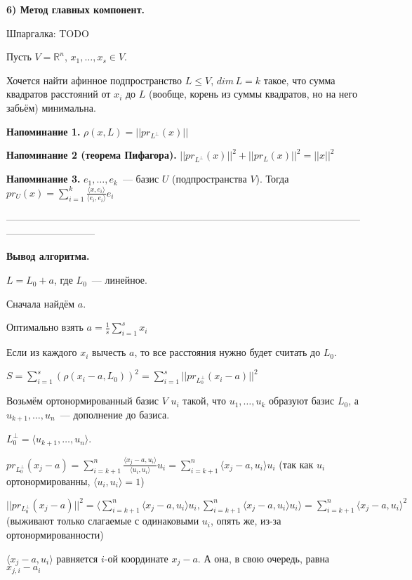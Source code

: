 {\bf 6) Метод главных компонент.}

Шпаргалка: TODO

Пусть $V = \mathbb{R}^n$, $x_1,\ldots, x_s \in V$.

Хочется найти афинное подпространство $L\le V$, $dim\,L = k$ такое, что сумма квадратов расстояний от $x_i$ до $L$ (вообще, корень из суммы квадратов, но на него забьём) минимальна.

{\bf Напоминание 1.} $\rho(x, L) = ||pr_{L^{\perp}}(x)||$

{\bf Напоминание 2 (теорема Пифагора).} $||pr_{L^{\perp}}(x)||^2 + ||pr_L(x)||^2 = ||x||^2$

{\bf Напоминание 3.} $e_1,\ldots,e_k$~--- базис $U$ (подпространства $V$). Тогда $pr_U(x)=\sum\limits_{i=1}^k\frac{\langle x, e_i\rangle}{\langle e_i, e_i\rangle}e_i$

---------------------------------------------------------------------------------------------------------------------------------------

{\bf Вывод алгоритма.}

$L = L_0 + a$, где $L_0$~--- линейное. 

Сначала найдём $a$.

\thrm Оптимально взять $a=\frac{1}{s}\sum\limits_{i=1}^s x_i$

\proof

Если из каждого $x_i$ вычесть $a$, то все расстояния нужно будет считать до $L_0$.

$S = \sum\limits_{i = 1}^s (\rho(x_i-a, L_0))^2 = \sum\limits_{i = 1}^s ||pr_{L_0^{\perp}}(x_i-a)||^2$

Возьмём ортонормированный базис $V$ $u_i$ такой, что $u_1,\ldots, u_k$ образуют базис $L_0$, а $u_{k+1},\ldots,u_n$~--- дополнение до базиса.

$L_0^\perp = \langle u_{k+1},\ldots,u_n\rangle$. 

$pr_{L_0^{\perp}}(x_j-a) = \sum\limits_{i = k + 1}^n \frac{\langle x_j - a, u_i\rangle}{\langle u_i, u_i\rangle}u_i = \sum\limits_{i = k + 1}^n \langle x_j - a, u_i\rangle u_i$ (так как $u_i$ ортонормированны, $\langle u_i, u_i\rangle = 1$)

$||pr_{L_0^{\perp}}(x_j-a)||^2 = \langle\sum\limits_{i = k + 1}^n \langle x_j - a, u_i\rangle u_i, \sum\limits_{i = k + 1}^n \langle x_j - a, u_i\rangle u_i\rangle = \sum\limits_{i = k + 1}^n \langle x_j - a, u_i\rangle^2$ (выживают только слагаемые с одинаковыми $u_i$, опять же, из-за ортонормированности)

$\langle x_j - a, u_i\rangle$ равняется $i$-ой координате $x_j - a$. А она, в свою очередь, равна $x_{j, i} - a_i$

